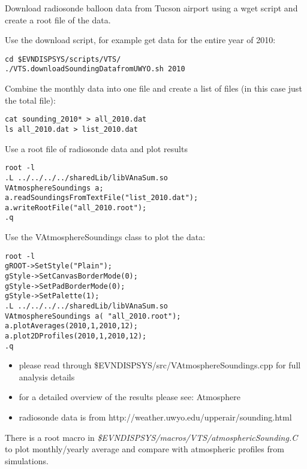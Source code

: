 \documentclass[titlepage,a4paper,twoside,11pt]{report}
\begin{document}
Download radiosonde balloon data from Tucson airport using a wget script and create a root file of the data.

Use the download script, for example get data for the entire year of 2010: 

\begin{lstlisting}
cd $EVNDISPSYS/scripts/VTS/
./VTS.downloadSoundingDatafromUWYO.sh 2010
\end{lstlisting}

Combine the monthly data into one file and create a list of files (in this case just the total file): 

\begin{lstlisting}
cat sounding_2010* > all_2010.dat
ls all_2010.dat > list_2010.dat
\end{lstlisting}

Use a root file of radiosonde data and plot results 

\begin{lstlisting}
root -l
.L ../../../../sharedLib/libVAnaSum.so 
VAtmosphereSoundings a;
a.readSoundingsFromTextFile("list_2010.dat");
a.writeRootFile("all_2010.root");
.q
\end{lstlisting}

Use the VAtmosphereSoundings class to plot the data: 

\begin{lstlisting}
root -l
gROOT->SetStyle("Plain");
gStyle->SetCanvasBorderMode(0);
gStyle->SetPadBorderMode(0);
gStyle->SetPalette(1); 
.L ../../../../sharedLib/libVAnaSum.so 
VAtmosphereSoundings a( "all_2010.root"); 
a.plotAverages(2010,1,2010,12);
a.plot2DProfiles(2010,1,2010,12);
.q
\end{lstlisting}

\begin{itemize}
\item please read through \$EVNDISPSYS/src/VAtmosphereSoundings.cpp for full analysis details 
\item for a detailed overview of the results please see: Atmosphere 
\item radiosonde data is from http://weather.uwyo.edu/upperair/sounding.html 
\end{itemize}

There is a root macro in {\it \$EVNDISPSYS/macros/VTS/atmosphericSounding.C} to plot monthly/yearly average and compare 
with atmospheric profiles from simulations.

\end{document}
